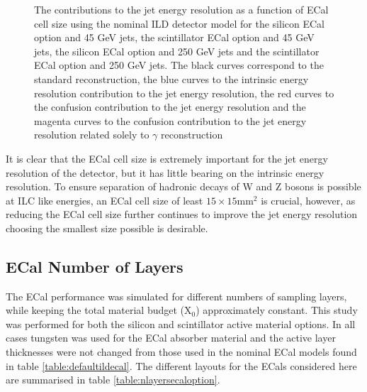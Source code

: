 \begin{figure}[h!]
\caption[The contributions to the jet energy resolution as a function of ECal cell size using the nominal ILD detector model for \protect{} the silicon ECal option and 45 GeV jets, \protect{} the scintillator ECal option and 45 GeV jets, \protect{} the silicon ECal option and 250 GeV jets and \protect{} the scintillator ECal option and 250 GeV jets.  The black curves correspond to the standard reconstruction, the blue curves to the intrinsic energy resolution contribution to the jet energy resolution, the red curves to the confusion contribution to the jet energy resolution and the magenta curves to the confusion contribution to the jet energy resolution related solely to $\gamma$ reconstruction.]{The contributions to the jet energy resolution as a function of ECal cell size using the nominal ILD detector model for \protect{} the silicon ECal option and 45 GeV jets, \protect{} the scintillator ECal option and 45 GeV jets, \protect{} the silicon ECal option and 250 GeV jets and \protect{} the scintillator ECal option and 250 GeV jets.  The black curves correspond to the standard reconstruction, the blue curves to the intrinsic energy resolution contribution to the jet energy resolution, the red curves to the confusion contribution to the jet energy resolution and the magenta curves to the confusion contribution to the jet energy resolution related solely to $\gamma$ reconstruction}
\label{fig:ecalcellsizebreak}
\end{figure}

It is clear that the ECal cell size is extremely important for the jet energy resolution of the detector, but it has little bearing on the intrinsic energy resolution.  To ensure separation of hadronic decays of W and Z bosons is possible at ILC like energies, an ECal cell size of least $15 \times 15 \text{mm}^{2}$ is crucial, however, as reducing the ECal cell size further continues to improve the jet energy resolution choosing the smallest size possible is desirable.   


\subsection{ECal Number of Layers} 
\label{sec:ecalnlayers}
The ECal performance was simulated for different numbers of sampling layers, while keeping the total material budget ($\text{X}_{0}$) approximately constant.  This study was performed for both the silicon and scintillator active material options.  In all cases tungsten was used for the ECal absorber material and the active layer thicknesses were not changed from those used in the nominal ECal models found in table \ref{table:defaultildecal}.  The different layouts for the ECals considered here are summarised in table \ref{table:nlayersecaloption}.  

